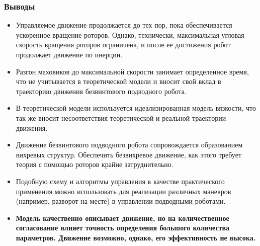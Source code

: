\begin{frame}
\frametitle{Выводы}

\begin{itemize}
	\item	Управляемое движение продолжается до тех пор, пока обеспечивается ускоренное вращение роторов. Однако, технически, максимальная угловая скорость вращения роторов ограничена, и после ее достижения робот продолжает движение по инерции.
	\item Разгон маховиков до максимальной скорости занимает определенное время, что не учитывается в теоретической модели и вносит свой вклад в траекторию движения безвинтового подводного робота.
	\item В теоретической модели используется идеализированная модель вязкости, что так же вносит несоответствия теоретической и реальной траектории движения.
	
	
	\item	Движение безвинтового подводного робота сопровождается образованием вихревых структур. Обеспечить безвихревое движение, как этого требует теория с помощью роторов крайне затруднительно. 
	
	

	
	\item Подобную схему и алгоритмы управления в качестве практического применения можно использовать для реализации различных маневров (например, разворот на месте) в управлении подводными роботами.
	
	\item \textbf{Модель качественно описывает движение, но на количественное согласование влияет точность определения большого количества параметров. Движение возможно, однако, его эффективность не высока.}
\end{itemize}

\end{frame}

%
%
%
%
%


%

